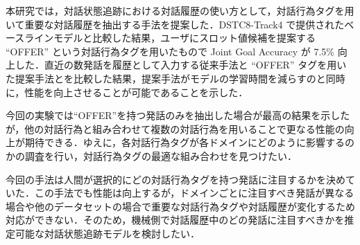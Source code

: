 本研究では，対話状態追跡における対話履歴の使い方として，対話行為タグを用いて重要な対話履歴を抽出する手法を提案した．DSTC8-Track4 で提供されたベースラインモデルと比較した結果，ユーザにスロット値候補を提案する “OFFER” という対話行為タグを用いたもので Joint Goal Accuracy が 7.5\% 向上した．直近の数発話を履歴として入力する従来手法と “OFFER” タグを用いた提案手法とを比較した結果，提案手法がモデルの学習時間を減らすのと同時に，性能を向上させることが可能であることを示した．
\par
今回の実験では“OFFER”を持つ発話のみを抽出した場合が最高の結果を示したが，他の対話行為と組み合わせて複数の対話行為を用いることで更なる性能の向上が期待できる．ゆえに，各対話行為タグが各ドメインにどのように影響するのかの調査を行い，対話行為タグの最適な組み合わせを見つけたい．
\par
今回の手法は人間が選択的にどの対話行為タグを持つ発話に注目するかを決めていた．この手法でも性能は向上するが，ドメインごとに注目すべき発話が異なる場合や他のデータセットの場合で重要な対話行為タグや対話履歴が変化するため対応ができない．そのため，機械側で対話履歴中のどの発話に注目すべきかを推定可能な対話状態追跡モデルを検討したい．